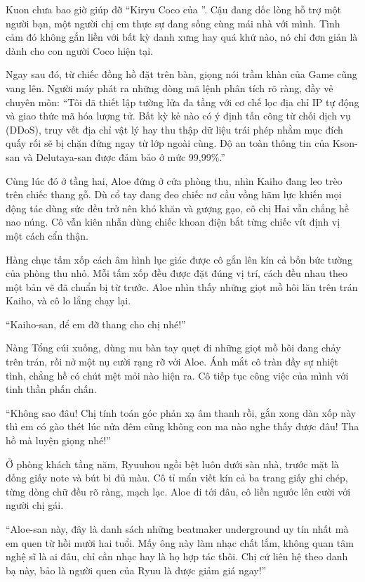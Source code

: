 ﻿\documentclass[../main.tex]{subfiles}
\begin{document}
Kuon chưa bao giờ giúp đỡ ``Kiryu Coco của \hll''. Cậu đang dốc lòng hỗ trợ một người bạn, một người chị em thực sự đang sống cùng mái nhà với mình. Tình cảm đó không gắn liền với bất kỳ danh xưng hay quá khứ nào, nó chỉ đơn giản là dành cho con người Coco hiện tại.

Ngay sau đó, từ chiếc đồng hồ đặt trên bàn, giọng nói trầm khàn của Game cũng vang lên. Người máy phát ra những dòng mã lệnh phân tích rõ ràng, đầy vẻ chuyên môn: ``Tôi đã thiết lập tường lửa đa tầng với cơ chế lọc địa chỉ IP tự động và giao thức mã hóa lượng tử. Bất kỳ kẻ nào có ý định tấn công từ chối dịch vụ (DDoS), truy vết địa chỉ vật lý hay thu thập dữ liệu trái phép nhằm mục đích quấy rối sẽ bị chặn đứng ngay từ lớp ngoài cùng. Độ an toàn thông tin của Kson-san và Delutaya-san được đảm bảo ở mức 99,99\%.''

\ct

Cùng lúc đó ở tầng hai, Aloe đứng ở cửa phòng thu, nhìn Kaiho đang leo trèo trên chiếc thang gỗ. Dù cổ tay đang đeo chiếc nơ cầu vồng hãm lực khiến mọi động tác dùng sức đều trở nên khó khăn và gượng gạo, cô chị Hai vẫn chẳng hề nao núng. Cô vẫn kiên nhẫn dùng chiếc khoan điện bắt từng chiếc vít định vị một cách cẩn thận.

Hàng chục tấm xốp cách âm hình lục giác được cô gắn lên kín cả bốn bức tường của phòng thu nhỏ. Mỗi tấm xốp đều được đặt đúng vị trí, cách đều nhau theo một bản vẽ đã chuẩn bị từ trước. Aloe nhìn thấy những giọt mồ hôi lăn trên trán Kaiho, và cô lo lắng chạy lại.

``Kaiho-san, để em đỡ thang cho chị nhé!''

Nàng Tổng cúi xuống, dùng mu bàn tay quẹt đi những giọt mồ hôi đang chảy trên trán, rồi nở một nụ cười rạng rỡ với Aloe. Ánh mắt cô tràn đầy sự nhiệt tình, chẳng hề có chút mệt mỏi nào hiện ra. Cô tiếp tục công việc của mình với tinh thần phấn chấn.

``Không sao đâu! Chị tính toán góc phản xạ âm thanh rồi, gắn xong dàn xốp này thì em có gào thét lúc nửa đêm cũng không con ma nào nghe thấy được đâu! Tha hồ mà luyện giọng nhé!''

Ở phòng khách tầng năm, Ryuuhou ngồi bệt luôn dưới sàn nhà, trước mặt là đống giấy note và bút bi đủ màu. Cô tỉ mẩn viết kín cả ba trang giấy ghi chép, từng dòng chữ đều rõ ràng, mạch lạc. Aloe đi tới đâu, cô liền ngước lên cười với người chị gái.

``Aloe-san này, đây là danh sách những beatmaker underground uy tín nhất mà em quen từ hồi mười hai tuổi. Mấy ông này làm nhạc chất lắm, không quan tâm nghệ sĩ là ai đâu, chỉ cần nhạc hay là họ hợp tác thôi. Chị cứ liên hệ theo danh bạ này, bảo là người quen của Ryuu là được giảm giá ngay!''
\end{document}
